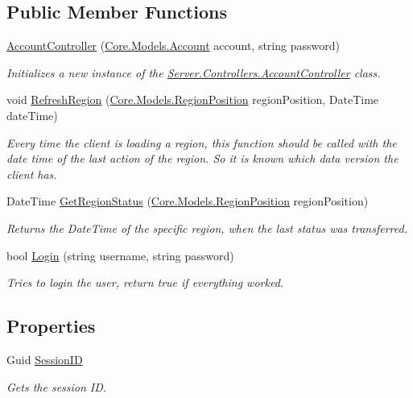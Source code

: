 \subsection*{Public Member Functions}
\begin{DoxyCompactItemize}
\item 
\hyperlink{classServer_1_1Controllers_1_1AccountController_ac35adf7e9f6d20dfbf584df2723b320c}{Account\+Controller} (\hyperlink{classCore_1_1Models_1_1Account}{Core.\+Models.\+Account} account, string password)
\begin{DoxyCompactList}\small\item\em Initializes a new instance of the \hyperlink{classServer_1_1Controllers_1_1AccountController}{Server.\+Controllers.\+Account\+Controller} class. \end{DoxyCompactList}\item 
void \hyperlink{classServer_1_1Controllers_1_1AccountController_a2326ec6c25856d4dcf65d9422b753c97}{Refresh\+Region} (\hyperlink{classCore_1_1Models_1_1RegionPosition}{Core.\+Models.\+Region\+Position} region\+Position, Date\+Time date\+Time)
\begin{DoxyCompactList}\small\item\em Every time the client is loading a region, this function should be called with the date time of the last action of the region. So it is known which data version the client has. \end{DoxyCompactList}\item 
Date\+Time \hyperlink{classServer_1_1Controllers_1_1AccountController_ae318dc148368d8a293c7fdf6dabceab6}{Get\+Region\+Status} (\hyperlink{classCore_1_1Models_1_1RegionPosition}{Core.\+Models.\+Region\+Position} region\+Position)
\begin{DoxyCompactList}\small\item\em Returns the Date\+Time of the specific region, when the last status was transferred. \end{DoxyCompactList}\item 
bool \hyperlink{classServer_1_1Controllers_1_1AccountController_a73d7223e39a37a1adfb3b04ab7513031}{Login} (string username, string password)
\begin{DoxyCompactList}\small\item\em Tries to login the user, return true if everything worked. \end{DoxyCompactList}\end{DoxyCompactItemize}
\subsection*{Properties}
\begin{DoxyCompactItemize}
\item 
Guid \hyperlink{classServer_1_1Controllers_1_1AccountController_a243d08e18b7e88f0ed33f3283aaf5709}{Session\+I\+D}
\begin{DoxyCompactList}\small\item\em Gets the session I\+D. \end{DoxyCompactList}\end{DoxyCompactItemize}


